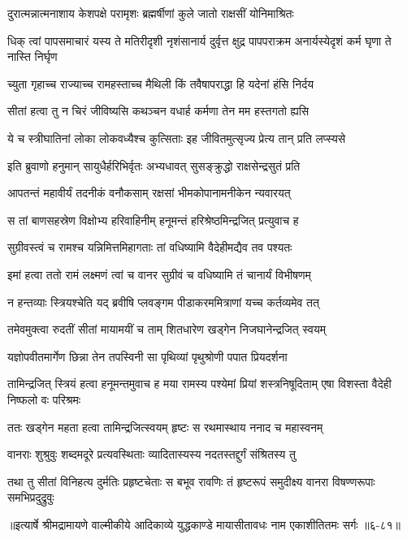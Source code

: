 \twolineshloka
{दुरात्मन्नात्मनाशाय केशपक्षे परामृशः}
{ब्रह्मर्षीणां कुले जातो राक्षसीं योनिमाश्रितः} %

\threelineshloka
{धिक् त्वां पापसमाचारं यस्य ते मतिरीदृशी}
{नृशंसानार्य दुर्वृत्त क्षुद्र पापपराक्रम}
{अनार्यस्येदृशं कर्म घृणा ते नास्ति निर्घृण} %

\twolineshloka
{च्युता गृहाच्च राज्याच्च रामहस्ताच्च मैथिली}
{किं तवैषापराद्धा हि यदेनां हंसि निर्दय} %

\twolineshloka
{सीतां हत्वा तु न चिरं जीविष्यसि कथञ्चन}
{वधार्ह कर्मणा तेन मम हस्तगतो ह्यसि} %

\twolineshloka
{ये च स्त्रीघातिनां लोका लोकवध्यैश्च कुत्सिताः}
{इह जीवितमुत्सृज्य प्रेत्य तान् प्रति लप्स्यसे} %

\twolineshloka
{इति ब्रुवाणो हनुमान् सायुधैर्हरिभिर्वृतः}
{अभ्यधावत् सुसङ्क्रुद्धो राक्षसेन्द्रसुतं प्रति} %

\twolineshloka
{आपतन्तं महावीर्यं तदनीकं वनौकसाम्}
{रक्षसां भीमकोपानामनीकेन न्यवारयत्} %

\twolineshloka
{स तां बाणसहस्रेण विक्षोभ्य हरिवाहिनीम्}
{हनूमन्तं हरिश्रेष्ठमिन्द्रजित् प्रत्युवाच ह} %

\twolineshloka
{सुग्रीवस्त्वं च रामश्च यन्निमित्तमिहागताः}
{तां वधिष्यामि वैदेहीमद्यैव तव पश्यतः} %

\twolineshloka
{इमां हत्वा ततो रामं लक्ष्मणं त्वां च वानर}
{सुग्रीवं च वधिष्यामि तं चानार्यं विभीषणम्} %

\twolineshloka
{न हन्तव्याः स्त्रियश्चेति यद् ब्रवीषि प्लवङ्गम}
{पीडाकरममित्राणां यच्च कर्तव्यमेव तत्} %

\twolineshloka
{तमेवमुक्त्वा रुदतीं सीतां मायामयीं च ताम्}
{शितधारेण खड्गेन निजघानेन्द्रजित् स्वयम्} %

\twolineshloka
{यज्ञोपवीतमार्गेण छिन्ना तेन तपस्विनी}
{सा पृथिव्यां पृथुश्रोणी पपात प्रियदर्शना} %

\threelineshloka
{तामिन्द्रजित् स्त्रियं हत्वा हनूमन्तमुवाच ह}
{मया रामस्य पश्येमां प्रियां शस्त्रनिषूदिताम्}
{एषा विशस्ता वैदेही निष्फलो वः परिश्रमः} %

\twolineshloka
{ततः खड्गेन महता हत्वा तामिन्द्रजित्स्वयम्}
{हृष्टः स रथमास्थाय ननाद च महास्वनम्} %

\twolineshloka
{वानराः शुश्रुवुः शब्दमदूरे प्रत्यवस्थिताः}
{व्यादितास्यस्य नदतस्तद्दुर्गं संश्रितस्य तु} %

\twolineshloka
{तथा तु सीतां विनिहत्य दुर्मतिः प्रहृष्टचेताः स बभूव रावणिः}
{तं हृष्टरूपं समुदीक्ष्य वानरा विषण्णरूपाः समभिप्रदुद्रुवुः} %


॥इत्यार्षे श्रीमद्रामायणे वाल्मीकीये आदिकाव्ये युद्धकाण्डे मायासीतावधः नाम एकाशीतितमः सर्गः ॥६-८१॥
